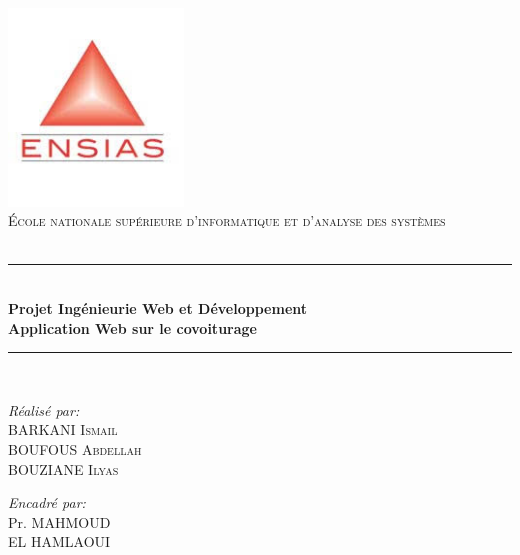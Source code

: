\documentclass[a4paper]{report}
\begin{document}
\begin{spacing}{2}
\newcommand{\HRule}{\rule{\linewidth}{0.5mm}}
\begin{titlepage}
\begin{center}

\includegraphics[width=0.35\textwidth]{./logo}~\\[1cm]

\textsc{\LARGE École nationale supérieure d'informatique et d'analyse des systèmes}\\[1.5cm]

\textsc{\Large }\\[0.5cm]

\HRule \\[0.4cm]

{\huge \bfseries Projet Ingénieurie Web et Développement\\
Application Web sur le covoiturage \\[0.4cm] }

\HRule \\[1.5cm]

\begin{minipage}{0.4\textwidth}
\begin{flushleft} \large
\emph{Réalisé par:}\\
\textsc{BARKANI Ismail}\\
\textsc{BOUFOUS Abdellah}\\
\textsc{BOUZIANE Ilyas}\\
\end{flushleft}
\end{minipage}
\begin{minipage}{0.4\textwidth}
\begin{flushright} \large
\emph{Encadré par:} \\
Pr. \textsc{MAHMOUD\\EL HAMLAOUI}\\
\end{flushright}
\end{minipage}


\end{center}
\end{titlepage}
\end{spacing}
\end{document}
